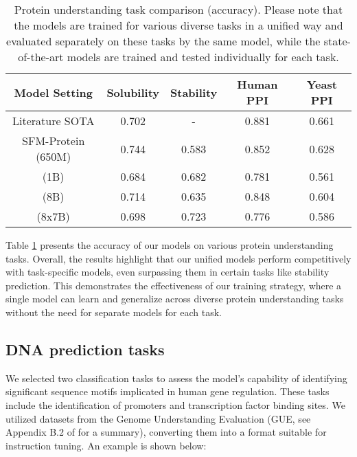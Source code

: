 \begin{table}[!h]
\centering
\begin{tabular}{ccccc}
\toprule
Model Setting & Solubility & Stability & Human PPI & Yeast PPI \\
\midrule
Literature SOTA & 0.702 & - & 0.881 & 0.661 \\
SFM-Protein (650M) \cite{he2024sfm} & 0.744 & 0.583 & 0.852 & 0.628 \\
\midrule
\ourM{} (1B) & 0.684 & 0.682 & 0.781 & 0.561 \\
\ourM{} (8B) & 0.714 & 0.635 & 0.848 & 0.604 \\ %
\ourM{} (8x7B) & 0.698 & 0.723 & 0.776 & 0.586 \\ %
\bottomrule
\end{tabular}
\caption{Protein understanding task comparison (accuracy). Please note that the \ourM{} models are trained for various diverse tasks in a unified way and evaluated separately on these tasks by the same model, while the state-of-the-art models are trained and tested individually for each task. }
\label{tab:protein:classification}
\end{table}

Table \ref{tab:protein:classification} presents the accuracy of our models on various protein understanding tasks. Overall, the results highlight that our unified \ourM{} models perform competitively with task-specific models, even surpassing them in certain tasks like stability prediction. This demonstrates the effectiveness of our training strategy, where a single model can learn and generalize across diverse protein understanding tasks without the need for separate models for each task.

\subsection{DNA prediction tasks}\label{sec:dna_property_pred}
We selected two classification tasks to assess the model's capability of identifying significant sequence motifs implicated in human gene regulation. These tasks include the identification of promoters and transcription factor binding sites.  We utilized datasets from the Genome Understanding Evaluation (GUE, see Appendix B.2 of \cite{zhou2024dnabert2} for a summary), converting them into a format suitable for instruction tuning. %
An example is shown below:

